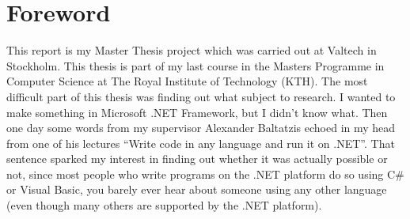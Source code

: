 \chapter*{Foreword}

This report is my Master Thesis project which was carried out at Valtech in Stockholm. This thesis is part of my last course in the Masters Programme in Computer Science at The Royal Institute of Technology (KTH). The most difficult part of this thesis was finding out what subject to research. I wanted to make something in Microsoft .NET Framework, but I didn't know what. Then one day some words from my supervisor Alexander Baltatzis echoed in my head from one of his lectures ``Write code in any language and run it on .NET''. That sentence sparked my interest in finding out whether it was actually possible or not, since most people who write programs on the .NET platform do so using C\# or Visual Basic, you barely ever hear about someone using any other language (even though many others are supported by the .NET platform). 